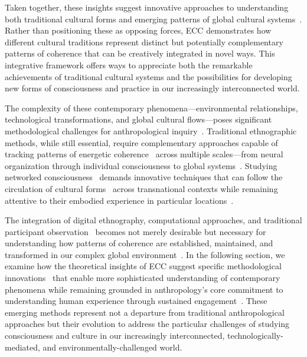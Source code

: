 Taken together, these insights suggest innovative approaches to understanding both traditional cultural forms and emerging patterns of global cultural systems~\cite{appadurai1996modernity, escobar1995encountering}. Rather than positioning these as opposing forces, ECC demonstrates how different cultural traditions represent distinct but potentially complementary patterns of coherence that can be creatively integrated in novel ways. This integrative framework offers ways to appreciate both the remarkable achievements of traditional cultural systems and the possibilities for developing new forms of consciousness and practice in our increasingly interconnected world.

The complexity of these contemporary phenomena---environmental relationships, technological transformations, and global cultural flows---poses significant methodological challenges for anthropological inquiry~\cite{marcus2012multi, rabinow2011accompaniment}. Traditional ethnographic methods, while still essential, require complementary approaches capable of tracking patterns of energetic coherence~ across multiple scales---from neural organization through individual consciousness to global systems~\cite{fischer2018anthropology, pink2016digital}. Studying networked consciousness~ demands innovative techniques that can follow the circulation of cultural forms~ across transnational contexts while remaining attentive to their embodied experience in particular locations~\cite{horst2012digital, fortun2012ethnography}.

The integration of digital ethnography, computational approaches, and traditional participant observation~ becomes not merely desirable but necessary for understanding how patterns of coherence are established, maintained, and transformed in our complex global environment~\cite{beaulieu2017vectors, boyer2015digital}. In the following section, we examine how the theoretical insights of ECC suggest specific methodological innovations~ that enable more sophisticated understanding of contemporary phenomena while remaining grounded in anthropology's core commitment to understanding human experience through sustained engagement~\cite{rabinow2008marking, jackson1989paths}. These emerging methods represent not a departure from traditional anthropological approaches but their evolution to address the particular challenges of studying consciousness and culture in our increasingly interconnected, technologically-mediated, and environmentally-challenged world.
